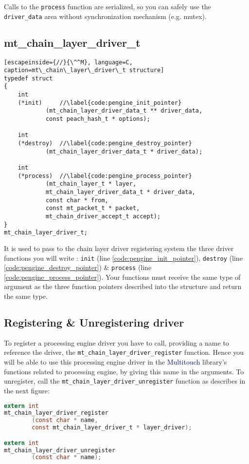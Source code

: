Calls to the \texttt{process} function are serialized, so you can 
safely use the \texttt{driver\_data} area without synchronization 
mechanism (e.g. mutex).


%
%
\subsection{mt\_chain\_layer\_driver\_t}
\label{sect:pengine_chain_layer_driver_t}

\begin{lstlisting}[escapeinside={//}{\^^M}, language=C,
caption=mt\_chain\_layer\_driver\_t structure]
typedef struct 
{
    int 
    (*init)     //\label{code:pengine_init_pointer}
            (mt_chain_layer_driver_data_t ** driver_data, 
            const peach_hash_t * options);

    int 
    (*destroy)  //\label{code:pengine_destroy_pointer}
            (mt_chain_layer_driver_data_t * driver_data);

    int
    (*process)  //\label{code:pengine_process_pointer}
            (mt_chain_layer_t * layer,
            mt_chain_layer_driver_data_t * driver_data,
            const char * from,
            const mt_packet_t * packet,
            mt_chain_driver_accept_t accept);
}
mt_chain_layer_driver_t;
\end{lstlisting}
It is used to pass to the chain layer driver registering system the three
driver functions you will write : \texttt{init} 
(line \ref{code:pengine_init_pointer}), 
\texttt{destroy} (line \ref{code:pengine_destroy_pointer}) \& 
\texttt{process} (line \ref{code:pengine_process_pointer}). Your functions 
must receive the same type of argument as the three function pointers 
described into the structure and return the same type.

%
%
\subsection{Registering \& Unregistering driver}
\label{sect:pengine_chain_driver_register}
\label{sect:pengine_chain_driver_unregister}

To register a processing engine driver you have to call, providing a name 
to reference the driver, the \texttt{mt\_chain\_layer\_driver\_register} 
function. Hence you will be able to use this
processing engine driver in the \textcolor{darkblue}{Multitouch} library's 
functions related to processing engine, by giving this name in the arguments.
To unregister, call the \texttt{mt\_chain\_layer\_driver\_unregister} 
function as describes in the next figure:
\begin{lstlisting}[language=C,
caption=Processing engine's driver registration functions]
extern int
mt_chain_layer_driver_register
        (const char * name,
        const mt_chain_layer_driver_t * layer_driver);

extern int
mt_chain_layer_driver_unregister
        (const char * name);
\end{lstlisting}

